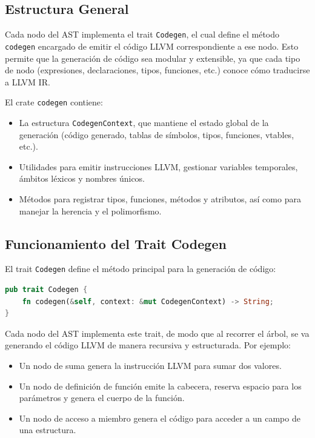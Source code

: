 \documentclass[a4paper, 12pt]{article}
\begin{document}
\subsection{Estructura General}

Cada nodo del AST implementa el trait \texttt{Codegen}, el cual define el método \texttt{codegen} encargado de emitir el código LLVM correspondiente a ese nodo. Esto permite que la generación de código sea modular y extensible, ya que cada tipo de nodo (expresiones, declaraciones, tipos, funciones, etc.) conoce cómo traducirse a LLVM IR.

El crate \texttt{codegen} contiene:
\begin{itemize}
  \item La estructura \texttt{CodegenContext}, que mantiene el estado global de la generación (código generado, tablas de símbolos, tipos, funciones, vtables, etc.).
  \item Utilidades para emitir instrucciones LLVM, gestionar variables temporales, ámbitos léxicos y nombres únicos.
  \item Métodos para registrar tipos, funciones, métodos y atributos, así como para manejar la herencia y el polimorfismo.
\end{itemize}

\subsection{Funcionamiento del Trait Codegen}

El trait \texttt{Codegen} define el método principal para la generación de código:
\begin{lstlisting}[language=Rust]
pub trait Codegen {
    fn codegen(&self, context: &mut CodegenContext) -> String;
}
\end{lstlisting}
Cada nodo del AST implementa este trait, de modo que al recorrer el árbol, se va generando el código LLVM de manera recursiva y estructurada. Por ejemplo:
\begin{itemize}
  \item Un nodo de suma genera la instrucción LLVM para sumar dos valores.
  \item Un nodo de definición de función emite la cabecera, reserva espacio para los parámetros y genera el cuerpo de la función.
  \item Un nodo de acceso a miembro genera el código para acceder a un campo de una estructura.
\end{itemize}
\end{document}
